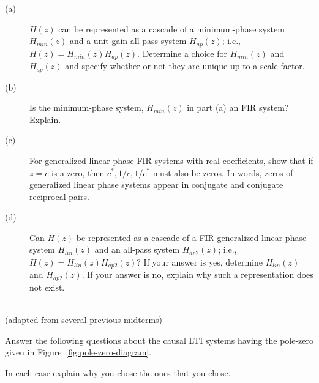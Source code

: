\documentclass[12pt]{report}
\begin{document}
\begin{description}
	\item[(a)] $H(z)$ can be represented as a cascade of a minimum-phase system $H_{min}(z)$ and a unit-gain all-pass system $H_{ap}(z)$; i.e., $H(z) = H_{min}(z)H_{ap}(z)$. Determine a choice for $H_{min}(z)$ and $H_{ap}(z)$ and specify whether or not they are unique up to a scale factor.
	\item[(b)] Is the minimum-phase system, $H_{min}(z)$ in part (a) an FIR system? Explain.
	\item[(c)] For generalized linear phase FIR systems with \underline{real} coefficients, show that if $z = c$ is a zero, then $c^*, 1/c, 1/c^*$ must also be zeros. In words, zeros of generalized linear phase systems appear in conjugate and conjugate reciprocal pairs.
	\item[(d)] Can $H(z)$ be represented as a cascade of a FIR generalized linear-phase system $H_{lin}(z)$ and an all-pass system $H_{ap2}(z)$; i.e., $H(z) = H_{lin}(z)H_{ap2}(z)$? If your answer is yes, determine $H_{lin}(z)$ and $H_{ap2}(z)$. If your answer is no, explain why such a representation does not exist.
\end{description}

\mbox{}\\ 
 (adapted from several previous midterms)

Answer the following questions about the causal LTI systems having the pole-zero given in Figure~\ref{fig:pole-zero-diagram}.

In each case \underline{explain} why you chose the ones that you chose.
\end{document}
